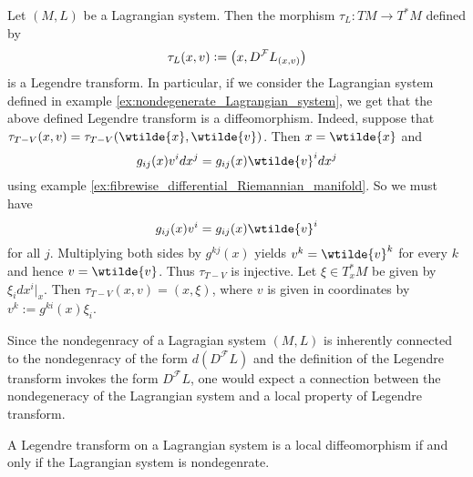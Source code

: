 \begin{example}
	\label{ex:Legendre_transform_Riemannian_manifold}
	Let $(M,L)$ be a Lagrangian system. Then the morphism $\tau_L : TM \to T^*M$ defined by
	\begin{equation}
		\label{eq:Legendre_transform}
		\tau_L(x,v) := \del[1]{x,D^\mathcal{F}L_{(x,v)}}
	\end{equation}
	\noindent is a Legendre transform. In particular, if we consider the Lagrangian system defined in example \ref{ex:nondegenerate_Lagrangian_system}, we get that the above defined Legendre transform is a diffeomorphism. Indeed, suppose that $\tau_{T - V}(x,v) = \tau_{T - V}(\wtilde{x},\wtilde{v})$. Then $x = \wtilde{x}$ and
	\begin{equation*}
		g_{ij}(x)v^idx^j = g_{ij}(x)\wtilde{v}^idx^j	
	\end{equation*}
	\noindent using example \ref{ex:fibrewise_differential_Riemannian_manifold}. So we must have
	\begin{equation*}
		g_{ij}(x)v^i = g_{ij}(x)\wtilde{v}^i
	\end{equation*}
	\noindent for all $j$. Multiplying both sides by $g^{kj}(x)$ yields $v^k = \wtilde{v}^k$ for every $k$ and hence $v = \wtilde{v}$. Thus $\tau_{T - V}$ is injective. Let $\xi \in T^*_xM$ be given by $\xi_i dx^i\vert_x$. Then $\tau_{T - V}(x,v) = (x,\xi)$, where $v$ is given in coordinates by $v^k := g^{ki}(x)\xi_i$.
\end{example} 

Since the nondegenracy of a Lagragian system $(M,L)$ is inherently connected to the nondegenracy of the form $d(D^\mathcal{F}L)$ and the definition of the Legendre transform invokes the form $D^\mathcal{F}L$, one would expect a connection between the nondegeneracy of the Lagrangian system and a local property of Legendre transform.

\begin{lemma}
	\label{lem:local_diffeomorphism}
	A Legendre transform on a Lagrangian system is a local diffeomorphism if and only if the Lagrangian system is nondegenrate.	
\end{lemma}

